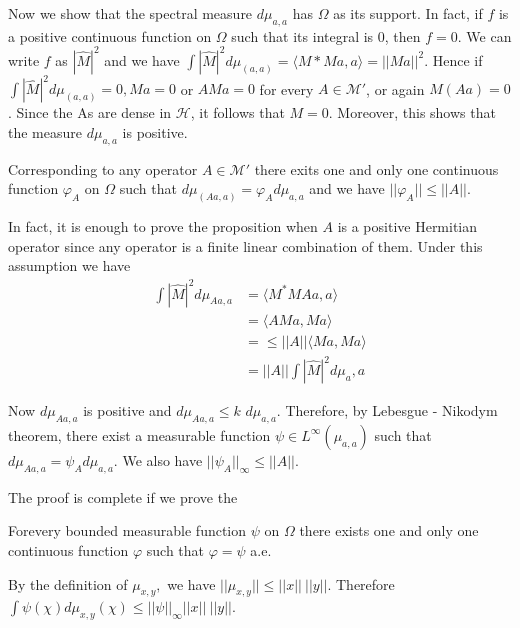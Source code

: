 Now we show that the spectral measure $d \mu_{a,a}$ has $\Omega$ as
its 
support. In fact, if $f$ is a positive continuous function on $\Omega$
such 
that its integral is $0$, then $f=0$. We can write $f$ as $|\hat{M}|^2$
and we  
have $\int|\hat{M}|^2 d \mu_{(a,a)} = \langle M*Ma,a \rangle =
||Ma||^2 $. Hence if $\int | \hat{M}|^2 d \mu_{(a,a)} = 0,         
     Ma = 0$ or $AMa = 0$ for every $A \in \mathscr{M}'$, or again
     $M(Aa)=0$. Since  
the As are dense in $\mathscr{H}$, it follows that $M=0$. Moreover,
this shows that the measure $d \mu_{a,a}$ is positive. 

\setcounter{proposition}{0}
\begin{proposition}\label{partIII-chap2-prop1}
Corresponding to any operator $A \in \mathscr{M}'$ there exits one and
only one continuous function $\varphi_{A}$ on $\Omega$ such that $d \mu_{(Aa,a)}
=\varphi_{A} d\mu_{a,a}$ and we have $|| \varphi _A|| \le || A || $. 
\end{proposition} 
 
In fact, it is enough to prove the proposition when $A$ is a 
positive Hermitian operator since any operator is a finite linear
combination of them. Under this assumption we have
\begin{align*}
 \int | \hat{M}|^2 d \mu_{Aa,a}   & = \langle  M^*MAa,a \rangle \\ 
 & = \langle AMa,Ma \rangle \\
 &  = \le || A || \langle Ma, Ma \rangle \\
 & = || A || \int | \widehat{M}|^2 d \mu_a, a
\end{align*}

Now  $d\mu_{Aa,a}$ is positive and $d \mu_{Aa,a} \le k$ $d
\mu_{a,a}$. Therefore, by Lebesgue - Nikodym theorem, there exist a
measurable function $\psi \in L^{\infty} (\mu_{a,a})$ such that $d
\mu_{Aa,a} = \psi_A d \mu_{a,a}$. We also have $|| \psi_{A}||_{\infty}
\le || A ||$. 

The proof is complete if we prove the 

\begin{lemma*}
For\pageoriginale every bounded measurable function $\psi$  on  $\Omega$ there
exists one and only one continuous function $\varphi$ such that $
\varphi =\psi $ a.e. 
\end{lemma*}

By the definition of $\mu _{x,y},$ we have $|| \mu _{x,y} || \le || x
||~ || y ||$.  
Therefore $\int \psi{(\chi)} d \mu_{x,y}(\chi) \le || \psi ||_\infty
|| x ||~ || y ||$. 



